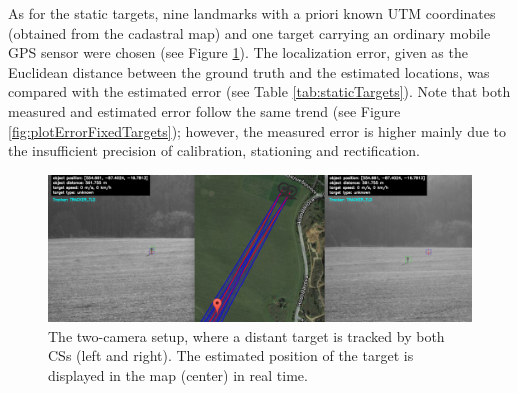 As for the static targets, nine landmarks with a priori known UTM coordinates (obtained from the cadastral map) and one target carrying an ordinary mobile GPS sensor were chosen (see Figure \ref{fig:trackingAndMap}). The localization error, given as the Euclidean distance between the ground truth and the estimated locations, was compared with the estimated error (see Table \ref{tab:staticTargets}). Note that both measured and estimated error follow the same trend (see Figure \ref{fig:plotErrorFixedTargets}); however, the measured error is higher mainly due to the insufficient precision of calibration, stationing and rectification. 

\begin{figure}[htb]\centering
	\centering
	\includegraphics[width=0.98\linewidth]{fig/tracking_and_map.png}
	\caption{The two-camera setup, where a distant target is tracked by both CSs (left and right). The estimated position of the target is displayed in the map (center) in real time.}
	\label{fig:trackingAndMap}
\end{figure}

